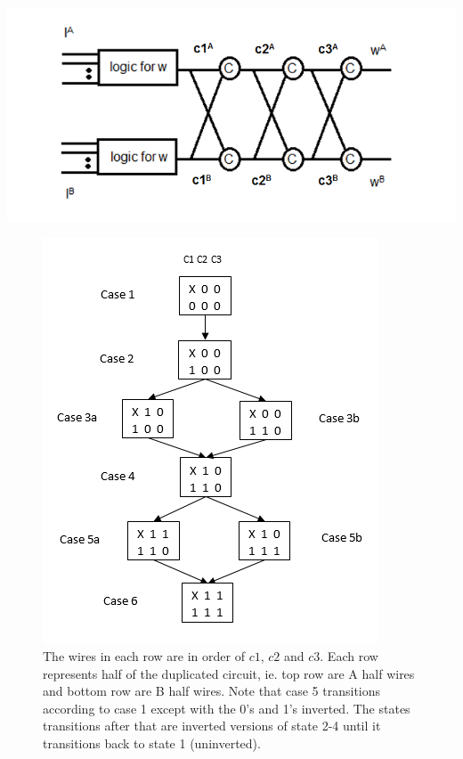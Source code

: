 \documentclass[12pt]{report}
\begin{document}
\includegraphics[width=.8\textwidth]{gatew}

\begin{figure}
  \centering
    \includegraphics{flowl4c3v2}
  \caption{The wires in each row are in order of $c1$, $c2$ and $c3$.  Each row represents half of the duplicated circuit, ie. top row are A half wires and bottom row are B half wires.  Note that case 5 transitions according to case 1 except with the 0's and 1's inverted.  The states transitions after that are inverted versions of state 2-4 until it transitions back to state 1 (uninverted).}
  \label{fig:l4}
\end{figure}
\end{document}
